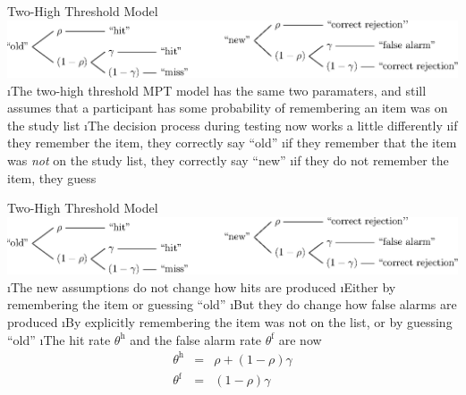 \documentclass[10pt]{beamer}
\begin{document}
\begin{frame}[fragile]{Two-High Threshold Model}
\includegraphics[width = \textwidth]{twoHighThreshold.eps}
\vspace{0.5em}
\bi
\i The two-high threshold MPT model has the same two paramaters, and still assumes that a participant has some probability of remembering an item was on the study list
\i The decision process during testing now works a little differently
\bi
\i if they remember the item, they correctly say ``old''
\i if they remember that the item was \emph{not} on the study list, they correctly say ``new''
\i if they do not remember the item, they guess
\ei
\ei
\end{frame}

\begin{frame}[fragile]{Two-High Threshold Model}
\includegraphics[width = \textwidth]{figures/twoHighThreshold.eps}
\vspace{0.5em}
\bi
\i The new assumptions do not change how hits are produced
\bi
\i Either by remembering the item or guessing ``old''
\ei
\i But they do change how false alarms are produced
\bi
\i By explicitly remembering the item was not on the list, or by guessing ``old''
\ei
\i The hit rate $\theta^\mathrm{h}$ and the false alarm rate $\theta^\mathrm{f}$ are now
\begin{eqnarray}
 \theta^\mathrm{h} &=& \rho + \left(1-\rho\right)\gamma \nonumber\\
 \theta^\mathrm{f} &=& \left(1-\rho\right)\gamma \nonumber
\end{eqnarray}
\ei
\end{frame}
\end{document}
